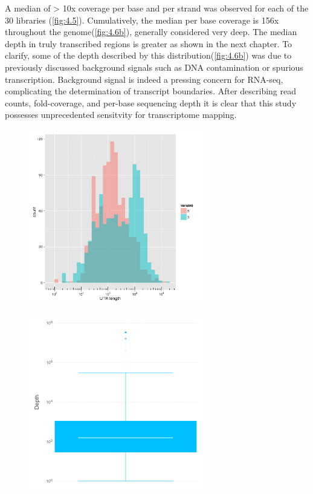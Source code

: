 A median of > 10x coverage per base and per strand was observed for each of the 30 libraries (\ref{fig:4.5}). Cumulatively, the median per base coverage is 156x throughout the genome(\ref{fig:4.6b}), generally considered very deep. The median depth in truly transcribed regions is greater as shown in the next chapter. To clarify, some of the depth described by this distribution(\ref{fig:4.6b}) was due to previously discussed background signals such as DNA contamination\cite{176} or spurious transcription.\cite{164,165} Background signal is indeed a pressing concern for RNA-seq,\cite{110,176,57} complicating the determination of transcript boundaries. After describing read counts, fold-coverage, and per-base sequencing depth it is clear that this study possesses unprecedented sensitvity for transcriptome mapping.


\begin{figure}
\begin{center}
\begin{minipage}{.5\textwidth}
\begin{center}
{\includegraphics[width=\linewidth,height=3in]{images/Assembly/Summary/futrlength.png}}
\label{fig:4.6a}
\end{center}
\end{minipage}%
\begin{minipage}{.5\textwidth}
\begin{center}
{\includegraphics[width=\linewidth,height=3in]{images/Sequencing/Cumulative_depth_boxplot.png}}

\end{center}
\end{minipage}
\end{center}
\end{figure}
